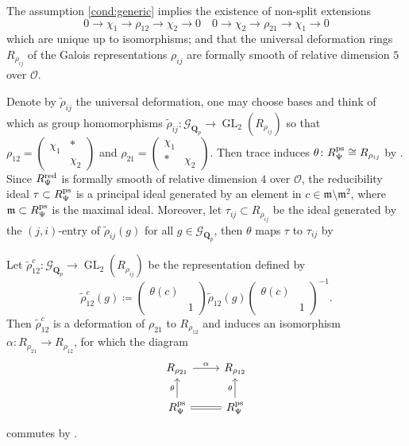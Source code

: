 \documentclass[leqno]{amsart}
\newcommand{\smat}[1]{\left( \begin{smallmatrix} #1 \end{smallmatrix} \right)}
\newcommand{\Gp}{\mathcal{G}_{\Qp}} %
\newcommand{\ps}{\textnormal{ps}}
\newcommand{\red}{\textnormal{red}}
\DeclareMathOperator{\GL}{GL}
\newcommand{\Qp}{\mathbf{Q}_p}
\newcommand{\oo}{\mathcal O}
\newcommand{\1}{\mathbf{1}}
\newcommand{\fm}{\mathfrak m}
\theoremstyle{definition}
\theoremstyle{remark}
\begin{document}
The assumption \eqref{cond:generic}
implies the existence of non-split extensions
\begin{equation*}
    0\to \chi_1\to \rho_{12}\to \chi_2\to 0\quad
    0\to \chi_2\to \rho_{21}\to \chi_1\to 0
\end{equation*}
which are unique up to isomorphisms;
and that the universal deformation rings
$R_{\rho_{ij}}$ of the Galois representations $\rho_{ij}$
are formally smooth of relative dimension $5$ over $\oo$.

Denote by $\tilde{\rho}_{ij}$ the universal deformation,
one may choose bases and think of which as group homomorphisms
$\tilde{\rho}_{ij}\colon \Gp\to \GL_2(R_{\rho_{ij}})$
so that 
$\rho_{12}=\smat{\chi_1&*\\&\chi_2}$ and
$\rho_{21}=\smat{\chi_1&\\ * &\chi_2}$.
Then trace induces $\theta\colon R_{\Psi}^{\ps}\cong R_{\rho_{ij}}$ by \cite[Prop B.17]{pask}.
Since $R^{\red}_{\Psi}$ is formally smooth of relative dimension $4$ over $\oo$,
the reducibility ideal  $\tau\subset R_{\Psi}^{\ps}$ is a principal ideal generated by 
an element in $c\in\fm\setminus \fm^2$,
where $\fm\subset R_{\Psi}^{\ps}$ is the maximal ideal. 
Moreover, let $\tau_{ij}\subset R_{\rho_{ij}} $ be the ideal 
generated by the $(j,i)$-entry of  $ \tilde{\rho}_{ij}(g)$
for all $g\in \Gp$,
then  $\theta$ maps  $\tau$ to  $\tau_{ij}$ by \cite[Prop B.23]{pask}

Let $\tilde{\rho}_{12}^c\colon \Gp\to \GL_2(R_{\rho_{ij}})$ be the representation defined by
\begin{equation*}
	\tilde{\rho}_{12}^c(g)\coloneqq 
	\smat{\theta(c)&\\&1}
	\tilde{\rho}_{12}(g)
	\smat{\theta(c)&\\&1}^{-1}.
\end{equation*}
Then $ \tilde{\rho}_{12}^c$ is a deformation of $\rho_{21}$ to $R_{\rho_{12}}$
and induces an isomorphism $\alpha\colon R_{\rho_{21}}\to R_{\rho_{12}}$,
for which the diagram
\begin{equation*}
	\begin{tikzcd}
		R_{\rho_{21}} \arrow[r,"\alpha"] &
		R_{\rho_{12}}\\
		R_{\Psi}^{\ps} \arrow[u,"\theta"] \arrow[r,equal] &
		R_{\Psi}^{\ps} \arrow[u,"\theta"]
	\end{tikzcd}
\end{equation*}
commutes by \cite[Prop B.24]{pask}.
\end{document}
